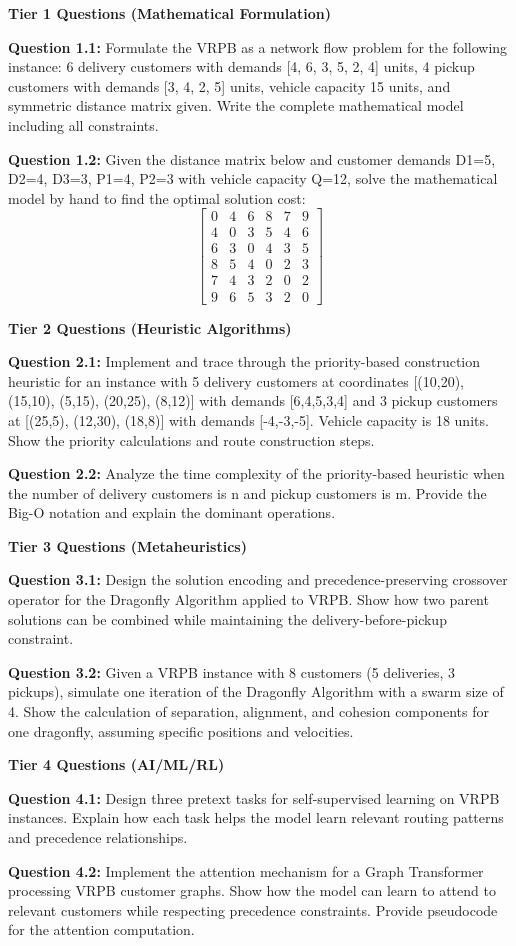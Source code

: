 \documentclass{article}
\begin{document}
\textbf{Tier 1 Questions (Mathematical Formulation)}

\textbf{Question 1.1:} Formulate the VRPB as a network flow problem for the following instance: 6 delivery customers with demands [4, 6, 3, 5, 2, 4] units, 4 pickup customers with demands [3, 4, 2, 5] units, vehicle capacity 15 units, and symmetric distance matrix given. Write the complete mathematical model including all constraints.

\textbf{Question 1.2:} Given the distance matrix below and customer demands D1=5, D2=4, D3=3, P1=4, P2=3 with vehicle capacity Q=12, solve the mathematical model by hand to find the optimal solution cost:
\[
\begin{bmatrix}
0 & 4 & 6 & 8 & 7 & 9 \\
4 & 0 & 3 & 5 & 4 & 6 \\
6 & 3 & 0 & 4 & 3 & 5 \\
8 & 5 & 4 & 0 & 2 & 3 \\
7 & 4 & 3 & 2 & 0 & 2 \\
9 & 6 & 5 & 3 & 2 & 0
\end{bmatrix}
\]

\textbf{Tier 2 Questions (Heuristic Algorithms)}

\textbf{Question 2.1:} Implement and trace through the priority-based construction heuristic for an instance with 5 delivery customers at coordinates [(10,20), (15,10), (5,15), (20,25), (8,12)] with demands [6,4,5,3,4] and 3 pickup customers at [(25,5), (12,30), (18,8)] with demands [-4,-3,-5]. Vehicle capacity is 18 units. Show the priority calculations and route construction steps.

\textbf{Question 2.2:} Analyze the time complexity of the priority-based heuristic when the number of delivery customers is n and pickup customers is m. Provide the Big-O notation and explain the dominant operations.

\textbf{Tier 3 Questions (Metaheuristics)}

\textbf{Question 3.1:} Design the solution encoding and precedence-preserving crossover operator for the Dragonfly Algorithm applied to VRPB. Show how two parent solutions can be combined while maintaining the delivery-before-pickup constraint.

\textbf{Question 3.2:} Given a VRPB instance with 8 customers (5 deliveries, 3 pickups), simulate one iteration of the Dragonfly Algorithm with a swarm size of 4. Show the calculation of separation, alignment, and cohesion components for one dragonfly, assuming specific positions and velocities.

\textbf{Tier 4 Questions (AI/ML/RL)}

\textbf{Question 4.1:} Design three pretext tasks for self-supervised learning on VRPB instances. Explain how each task helps the model learn relevant routing patterns and precedence relationships.

\textbf{Question 4.2:} Implement the attention mechanism for a Graph Transformer processing VRPB customer graphs. Show how the model can learn to attend to relevant customers while respecting precedence constraints. Provide pseudocode for the attention computation.
\end{document}
